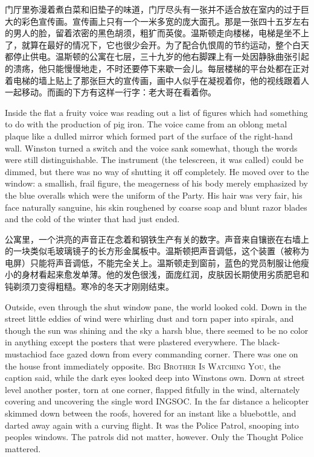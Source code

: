 \begin{paracol}{2}
\switchcolumn

门厅里弥漫着煮白菜和旧垫子的味道，门厅尽头有一张并不适合放在室内的过于巨大的彩色宣传画。宣传画上只有一个一米多宽的庞大面孔。那是一张四十五岁左右的男人的脸，留着浓密的黑色胡须，粗犷而英俊。温斯顿走向楼梯，电梯是坐不上了，就算在最好的情况下，它也很少会开。为了配合仇恨周的节约运动，整个白天都停止供电。温斯顿的公寓在七层，三十九岁的他右脚踝上有一处因静脉曲张引起的溃疡，他只能慢慢地走，不时还要停下来歇一会儿。每层楼梯的平台处都在正对着电梯的墙上贴上了那张巨大的宣传画，画中人似乎在凝视着你，他的视线跟着人一起移动。而画的下方有这样一行字：老大哥在看着你。

\switchcolumn*

Inside the flat a fruity voice was reading out a list of figures which
had something to do with the production of pig iron. The voice came from
an oblong metal plaque like a dulled mirror which formed part of the
surface of the right-hand wall. Winston turned a switch and the voice
sank somewhat, though the words were still distinguishable. The
instrument (the telescreen, it was called) could be dimmed, but there
was no way of shutting it off completely. He moved over to the window: a
smallish, frail figure, the meagerness of his body merely emphasized by
the blue overalls which were the uniform of the Party. His hair was very
fair, his face naturally sanguine, his skin roughened by coarse soap and
blunt razor blades and the cold of the winter that had just ended.

\switchcolumn

公寓里，一个洪亮的声音正在念着和钢铁生产有关的数字。声音来自镶嵌在右墙上的一块类似毛玻璃镜子的长方形金属板中。温斯顿把声音调低，这个装置（被称为电屏）只能将声音调低，不能完全关上。温斯顿走到窗前，蓝色的党员制服让他瘦小的身材看起来愈发单薄。他的发色很浅，面庞红润，皮肤因长期使用劣质肥皂和钝剃须刀变得粗糙。寒冷的冬天才刚刚结束。

\switchcolumn*

Outside, even through the shut window pane, the world looked cold. Down
in the street little eddies of wind were whirling dust and torn paper
into spirals, and though the sun was shining and the sky a harsh blue,
there seemed to be no color in anything except the posters that were
plastered everywhere. The black-mustachio\textquotesingle d face gazed
down from every commanding corner. There was one on the house front
immediately opposite. \textsc{Big Brother Is Watching You}, the caption said,
while the dark eyes looked deep into Winston\textquotesingle s own. Down
at street level another poster, torn at one corner, flapped fitfully in
the wind, alternately covering and uncovering the single word INGSOC. In
the far distance a helicopter skimmed down between the roofs, hovered
for an instant like a bluebottle, and darted away again with a curving
flight. It was the Police Patrol, snooping into people\textquotesingle s
windows. The patrols did not matter, however. Only the Thought Police
mattered.


\end{paracol}
